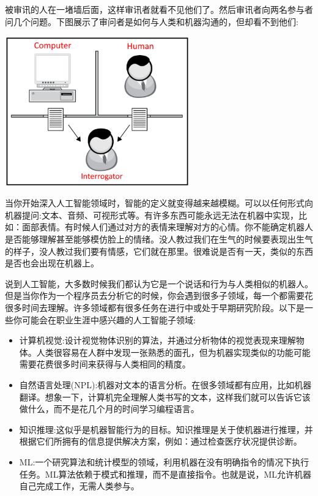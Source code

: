 被审讯的人在一堵墙后面，这样审讯者就看不见他们了。然后审讯者向两名参与者问几个问题。下图展示了审问者是如何与人类和机器沟通的，但却看不到他们: \par

\begin{center}
	\includegraphics[width=0.6\textwidth]{content/Section-3/Chapter-15/1}
\end{center}

当你开始深入人工智能领域时，智能的定义就变得越来越模糊。可以以任何形式向机器提问:文本、音频、可视形式等。有许多东西可能永远无法在机器中实现，比如：面部表情。有时候人们通过对方的表情来理解对方的心情。你不能确定机器人是否能够理解甚至能够模仿脸上的情绪。没人教过我们在生气的时候要表现出生气的样子，没人教过我们要有情感，它们就在那里。很难说是否有一天，类似的东西是否也会出现在机器上。 \par
说到人工智能，大多数时候我们都认为它是一个说话和行为与人类相似的机器人。但是当你作为一个程序员去分析它的时候，你会遇到很多子领域，每一个都需要花很多时间去理解。许多领域都有很多任务在进行中或处于早期研究阶段。以下是一些你可能会在职业生涯中感兴趣的人工智能子领域: \par

\begin{itemize}
	\item 计算机视觉:设计视觉物体识别的算法，并通过分析物体的视觉表现来理解物体。人类很容易在人群中发现一张熟悉的面孔，但为机器实现类似的功能可能需要花费很多时间来获得与人类相同的精度。
	\item 自然语言处理(NPL):机器对文本的语言分析。在很多领域都有应用，比如机器翻译。想象一下，计算机完全理解人类书写的文本，这样我们就可以告诉它该做什么，而不是花几个月的时间学习编程语言。
	\item 知识推理:这似乎是机器智能行为的目标。知识推理是关于使机器进行推理，并根据它们所拥有的信息提供解决方案，例如：通过检查医疗状况提供诊断。
	\item ML:一个研究算法和统计模型的领域，利用机器在没有明确指令的情况下执行任务。ML算法依赖于模式和推理，而不是直接指令。也就是说，ML允许机器自己完成工作，无需人类参与。
\end{itemize}

